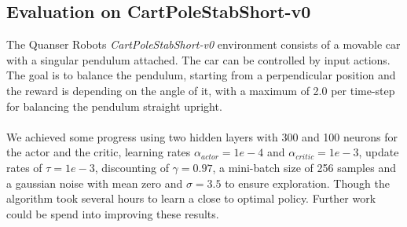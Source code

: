\subsection{Evaluation on CartPoleStabShort-v0}
The Quanser Robots \textit{CartPoleStabShort-v0} environment consists of a movable car with a singular pendulum attached. The car can be controlled by input actions. The goal is to balance the pendulum, starting from a perpendicular position and the reward is depending on the angle of it, with a maximum of 2.0 per time-step for balancing the pendulum straight upright.\\
\\
We achieved some progress using two hidden layers with 300 and 100 neurons for the actor and the critic, learning rates $\alpha_{actor}=1e-4$ and $\alpha_{critic}=1e-3$, update rates of $\tau=1e-3$, discounting of $\gamma=0.97$, a mini-batch size of 256 samples and a gaussian noise with mean zero and $\sigma=3.5$ to ensure exploration. Though the algorithm took several hours to learn a close to optimal policy. Further work could be spend into improving these results.


